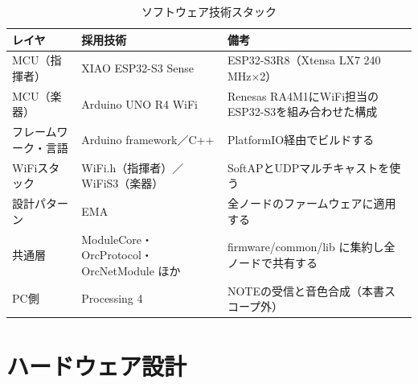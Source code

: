 \documentclass[lualatex,book,paper=a4paper,jafontsize=11.5pt,jafontscale=1.05]{jlreq}
\begin{document}
\begin{table}[H]\centering
  \caption{ソフトウェア技術スタック}\label{tab:sw-stack}
  \small
  \begin{tabularx}{\linewidth}{>{\raggedright\arraybackslash}p{2.9cm} >{\raggedright\arraybackslash}p{3.8cm} X}
    \toprule
    レイヤ & 採用技術 & 備考 \\
    \midrule
    MCU（指揮者） & XIAO ESP32-S3 Sense & ESP32-S3R8（Xtensa LX7 240\,MHz×2） \\
    MCU（楽器） & Arduino UNO R4 WiFi & Renesas RA4M1にWiFi担当のESP32-S3を組み合わせた構成 \\
    フレームワーク・言語 & Arduino framework／C++ & PlatformIO経由でビルドする \\
    WiFiスタック & WiFi.h（指揮者）／WiFiS3（楽器） & SoftAPとUDPマルチキャストを使う \\
    設計パターン & EMA & 全ノードのファームウェアに適用する \\
    共通層 & ModuleCore・OrcProtocol・OrcNetModule ほか & firmware/common/lib に集約し全ノードで共有する \\
    PC側 & Processing 4 & NOTEの受信と音色合成（本書スコープ外） \\
    \bottomrule
  \end{tabularx}
\end{table}

\section{ハードウェア設計}\label{sec:hw-design}
\end{document}
